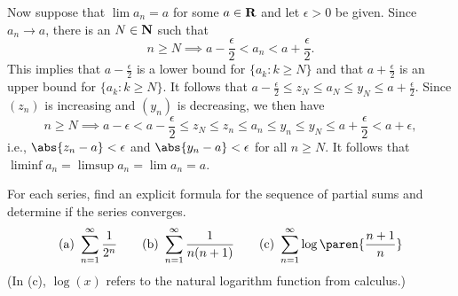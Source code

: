 \documentclass{lew98_solutions}
\begin{document}
\begin{solution}
\begin{enumerate}
        Now suppose that \( \lim a_n = a \) for some \( a \in \mathbf{R} \) and let \( \epsilon > 0 \) be given. Since \( a_n \to a \), there is an \( N \in \mathbf{N} \) such that
        \[
            n \geq N \implies a - \frac{\epsilon}{2} < a_n < a + \frac{\epsilon}{2}.
        \]
        This implies that \( a - \tfrac{\epsilon}{2} \) is a lower bound for \( \{ a_k : k \geq N \} \) and that \( a + \tfrac{\epsilon}{2} \) is an upper bound for \( \{ a_k : k \geq N \} \). It follows that \( a - \tfrac{\epsilon}{2} \leq z_N \leq a_N \leq y_N \leq a + \tfrac{\epsilon}{2} \). Since \( (z_n) \) is increasing and \( (y_n) \) is decreasing, we then have
        \[
            n \geq N \implies a - \epsilon < a - \frac{\epsilon}{2} \leq z_N \leq z_n \leq a_n \leq y_n \leq y_N \leq a + \frac{\epsilon}{2} < a + \epsilon,
        \]
        i.e., \( \abs{z_n - a} < \epsilon \) and \( \abs{y_n - a} < \epsilon \) for all \( n \geq N \). It follows that \( \liminf a_n = \limsup a_n = \lim a_n = a \).
    \end{enumerate}
\end{solution}

\begin{exercise}
\label{ex:2.4.8}
    For each series, find an explicit formula for the sequence of partial sums and determine if the series converges.
    \[
        \text{(a) } \sum_{n=1}^{\infty} \frac{1}{2^n} \qquad \text{(b) } \sum_{n=1}^{\infty} \frac{1}{n(n+1)} \qquad \text{(c) } \sum_{n=1}^{\infty} \log \paren{ \frac{n+1}{n} }
    \]
    (In (c), \( \log(x) \) refers to the natural logarithm function from calculus.)
\end{exercise}
\end{document}
